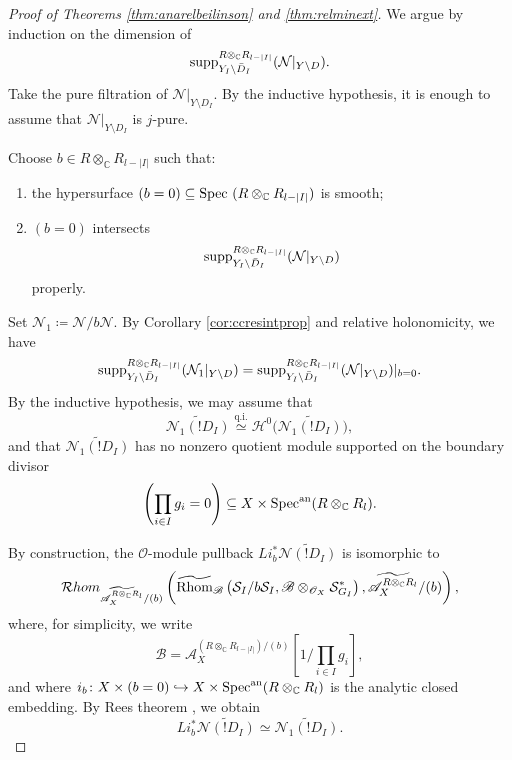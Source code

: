 \documentclass{amsart}
\theoremstyle{plain}
\numberwithin{theorem}{section}
\theoremstyle{definition}
\theoremstyle{remark}
\theoremstyle{definition}
\newcommand{\wt}{\widetilde}
\newcommand{\C}{\mathbb{C}} %
\newcommand{\cH}{\mathcal{H}}
\newcommand{\cN}{\mathcal{N}}
\newcommand{\cO}{\mathscr{O}}
\newcommand{\cS}{\mathcal{S}}
\newcommand{\sB}{\mathscr{B}}
\newcommand{\sA}{\mathscr{A}}
\newcommand{\Spec}{\textup{Spec }}
\newcommand{\Specan}{\textup{Spec}^{\textup{an}}}
\newcommand{\supp}{\textup{supp}}
\newcommand{\Rhom}{\textup{Rhom}}
\newcommand{\cRhom}{\mathcal Rhom}
\begin{document}
\begin{proof}[Proof of Theorems \ref{thm:anarelbeilinson} and \ref{thm:relminext}]
We argue by induction on the dimension of
\[
\supp_{Y_I\setminus \bar D_I}^{R\otimes_\C R_{l-|I|}}
(\cN|_{Y\setminus D}).
\]
Take the pure filtration of $\cN|_{Y\setminus D_I}$. By the inductive
hypothesis, it is enough to assume that $\cN|_{Y\setminus D_I}$ is $j$-pure.

Choose
$b\in R\otimes_\C R_{l-|I|}$
such that:
\begin{enumerate}[label=$(\arabic*)$]
    \item the hypersurface
    $(b=0)\subseteq \Spec(R\otimes_\C R_{l-|I|})$
    is smooth;
    \item $(b=0)$ intersects
    \[
    \supp_{Y_I\setminus \bar D_I}^{R\otimes_\C R_{l-|I|}}
    (\cN|_{Y\setminus D})
    \]
    properly.
\end{enumerate}
Set
$\cN_1\coloneqq \cN/b\cN.$
By Corollary \ref{cor:ccresintprop} and relative holonomicity, we have
\[
\supp_{Y_I\setminus \bar D_I}^{R\otimes_\C R_{l-|I|}}
(\cN_1|_{Y\setminus D})
=
\supp_{Y_I\setminus \bar D_I}^{R\otimes_\C R_{l-|I|}}
(\cN|_{Y\setminus D})|_{b=0}.
\]
By the inductive hypothesis, we may assume that
\[
\wt{\cN_1(!D_I)}
\stackrel{\mathrm{q.i.}}{\simeq}
\cH^0\big(\wt{\cN_1(!D_I)}\big),
\]
and that $\wt{\cN_1(!D_I)}$ has no nonzero quotient module supported on the
boundary divisor
\[
\left(\prod_{i\in I}g_i=0\right)
\subseteq
X\times\Specan(R\otimes_\C R_l).
\]

By construction, the $\cO$-module pullback
$Li_b^*\wt{\cN(!D_I)}$
is isomorphic to
\[
\cRhom_{\widetilde{\sA_X^{R\otimes_\C R_l}}/(b)}
\left(
\widetilde{\Rhom}_{\sB}
\left(
\cS_I/b\cS_I,
\sB\otimes_{\cO_X}\cS_{G_I}^*
\right),
\widetilde{\sA_X^{R\otimes_\C R_l}}/(b)
\right),
\]
where, for simplicity, we write
\[
\sB
=
\sA_X^{(R\otimes_\C R_{l-|I|})/(b)}
\left[1/\prod_{i\in I}g_i\right],
\]
and where
$i_b\colon
X\times (b=0)
\hookrightarrow
X\times \Specan(R\otimes_\C R_l)$
is the analytic closed embedding. By Rees theorem \cite[Thm. 8.34]{Rtha}, we
obtain
\[
Li_b^*\wt{\cN(!D_I)}
\simeq
\wt{\cN_1(!D_I)}.
\]


\end{proof}
\end{document}
